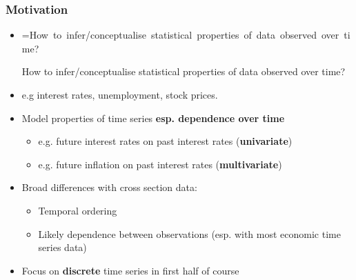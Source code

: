 \documentclass{beamer}
\makeatletter
\newcommand{\mybox}[1]{%
		\setbox0=\hbox{#1}%
		\setlength{\@tempdima}{\dimexpr\wd0+13pt}%
		\begin{tcolorbox}[colframe=ikb, colback=aliceblue ,boxrule=0.5pt,arc=4pt,
			left=6pt,right=6pt,top=6pt,bottom=6pt,boxsep=0pt,width=\@tempdima]
			#1
		\end{tcolorbox}
	}
\makeatother
\begin{document}
		
		\begin{frame}
			
			\frametitle{Motivation}
			
			\begin{itemize}
				
				\item[] \mybox{How to infer/conceptualise statistical properties of data observed over time?  }
				
				\vspace{5pt}
				\item[] e.g interest rates, unemployment, stock prices.
				\vspace{25pt}
				
				\pause
				
				\item[] Model properties of time series  \textbf{esp. dependence over time}
				\begin{itemize} \footnotesize
					\item[]  e.g. future interest rates on past interest rates (\textbf{univariate})
					\item[] e.g. future inflation on past interest rates (\textbf{multivariate})
					
				\end{itemize}
				\pause
				\vspace{25pt}
				\item[]
				Broad differences with cross section data:
				\begin{itemize} \footnotesize
					\item[]  Temporal ordering
					\item[] Likely dependence  between observations (esp. with most economic time series data)
					\pause
				\end{itemize}
				\vspace{25pt}
				\item[] Focus on \textbf{discrete} time series in first half of course
				
				
				
			\end{itemize}
			
			
		\end{frame}
		
\end{document}
